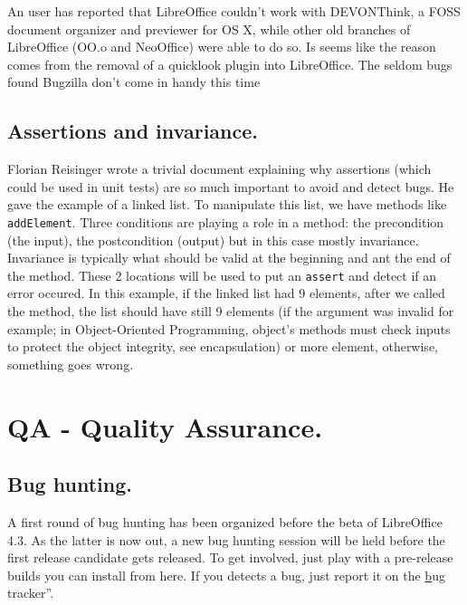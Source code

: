 \documentclass{article}
\begin{document}
An user has reported that LibreOffice couldn't work with DEVONThink, a FOSS document organizer and previewer for OS X, while other old branches of LibreOffice (OO.o and NeoOffice) were able to do so. Is seems like the reason comes from the removal of a quicklook plugin into LibreOffice. The seldom bugs found Bugzilla don't come in handy this time\cite{quicklookPlugin}

\subsection{Assertions and invariance.}

Florian Reisinger wrote a trivial document explaining why assertions (which could be used in unit tests) are so much important to avoid and detect bugs. He gave the example of a linked list. To manipulate this list, we have methods like \lstinline{addElement}. Three conditions are playing a role in a method: the precondition (the input), the postcondition (output) but in this case mostly invariance. Invariance is  typically what should be valid at the beginning and ant the end of the method. These 2 locations will be used to put an \lstinline{assert} and detect if an error occured. In this example, if the linked list had 9 elements, after we called the method, the list should have still 9 elements (if the argument was invalid for example; in Object-Oriented Programming, object's methods must check inputs to protect the object integrity, see encapsulation) or more element, otherwise, something goes wrong\cite{assertionsUnitTest}.



\section{QA - Quality Assurance.}

\subsection{Bug hunting.}

A first round of bug hunting has been organized before the beta of LibreOffice 4.3. As the latter is now out, a new bug hunting session will be held before the first release candidate gets released. To get involved, just play with a pre-release builds you can install from here\cite{preReleaseLink}. If you detects a bug, just report it on the \hyperref[bugTracker]bug tracker''\cite{bugHuntingRc11}\cite{bugHuntingRc12}.
\end{document}
